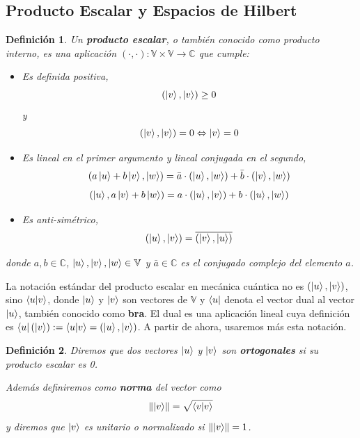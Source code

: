 \documentclass[a4paper]{article}
\newtheorem{deff}{Definición}[section]
\numberwithin{equation}{section}
\newcommand\norm[1]{\lVert#1\rVert}
\begin{document}
\subsection{Producto Escalar y Espacios de Hilbert}

\begin{deff}Un \textbf{producto escalar}, o también conocido como producto interno, es una aplicación $(\cdot, \cdot): \mathbb{V}\times\mathbb{V} \longrightarrow \mathbb{C}$ que cumple:
\begin{itemize}

\item Es definida positiva,
\begin{equation}
(\ket{v}, \ket{v}) \geq 0
\end{equation} y
\begin{equation}
(\ket{v}, \ket{v}) = 0 \Leftrightarrow \ket{v} = 0
\end{equation}

\item Es lineal en el primer argumento y lineal conjugada en el segundo,
\begin{equation}
(a\ket{u} + b\ket{v}, \ket{w}) = \bar{a} \cdot(\ket{u}, \ket{w}) + \bar{b} \cdot(\ket{v}, \ket{w})
\end{equation}
\begin{equation}
(\ket{u}, a\ket{v} + b\ket{w}) = a \cdot (\ket{u}, \ket{v}) + b \cdot (\ket{u}, \ket{w})
\end{equation}

\item Es anti-simétrico,
\begin{equation}
(\ket{u}, \ket{v}) = \overline{(\ket{v}, \ket{u})}
\end{equation}
\end{itemize}
donde $a,b \in \mathbb{C}$, $\ket{u}, \ket{v}, \ket{w} \in \mathbb{V}$ y $\bar{a} \in \mathbb{C}$ es el conjugado complejo del elemento $a$.
\end{deff}
La notación estándar del producto escalar en mecánica cuántica no es $(\ket{u}, \ket{v})$, sino $\braket{u|v}$, donde $\ket{u}$ y $\ket{v}$ son vectores de $\mathbb{V}$ y $\bra{u}$ denota el vector dual al vector $\ket{u}$, también conocido como \textbf{bra}. El dual es una aplicación lineal cuya definición es $\bra{u}(\ket{v}) := \braket{u|v} = (\ket{u},\ket{v})$. A partir de ahora, usaremos más esta notación.

\begin{deff}Diremos que dos vectores $\ket{u}$ y $\ket{v}$ son \textbf{ortogonales} si su producto escalar es 0.

Además definiremos como \textbf{norma} del vector como 
\begin{equation}
\norm{\ket{v}} = \sqrt{\braket{v|v}}
\end{equation}
y diremos que $\ket{v}$ es unitario o normalizado si $\norm{\ket{v}} = 1$.
\end{deff}
\end{document}
